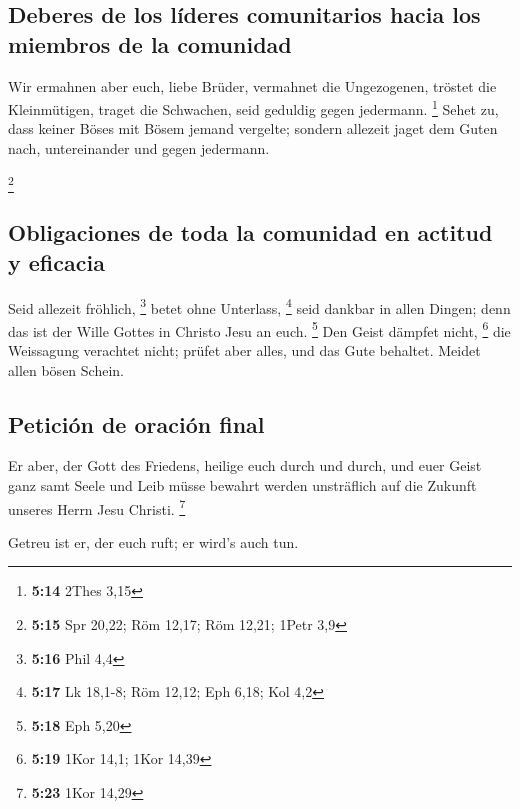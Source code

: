 \hypertarget{deberes-de-los-luxedderes-comunitarios-hacia-los-miembros-de-la-comunidad}{%
\subsection{Deberes de los líderes comunitarios hacia los miembros de la
comunidad}\label{deberes-de-los-luxedderes-comunitarios-hacia-los-miembros-de-la-comunidad}}

 Wir ermahnen aber euch, liebe Brüder, vermahnet die
Ungezogenen, tröstet die Kleinmütigen, traget die Schwachen, seid
geduldig gegen jedermann. \footnote{\textbf{5:14} 2Thes 3,15}
 Sehet zu, dass keiner Böses mit Bösem jemand vergelte;
sondern allezeit jaget dem Guten nach, untereinander und gegen
jedermann.

\footnote{\textbf{5:15} Spr 20,22; Röm 12,17; Röm 12,21; 1Petr 3,9}

\hypertarget{obligaciones-de-toda-la-comunidad-en-actitud-y-eficacia}{%
\subsection{Obligaciones de toda la comunidad en actitud y
eficacia}\label{obligaciones-de-toda-la-comunidad-en-actitud-y-eficacia}}

 Seid allezeit fröhlich, \footnote{\textbf{5:16} Phil 4,4}
 betet ohne Unterlass, \footnote{\textbf{5:17} Lk 18,1-8;
  Röm 12,12; Eph 6,18; Kol 4,2}  seid dankbar in allen
Dingen; denn das ist der Wille Gottes in Christo Jesu an euch.
\footnote{\textbf{5:18} Eph 5,20}  Den Geist dämpfet
nicht, \footnote{\textbf{5:19} 1Kor 14,1; 1Kor 14,39} 
die Weissagung verachtet nicht;  prüfet aber alles, und
das Gute behaltet.  Meidet allen bösen Schein.

\hypertarget{peticiuxf3n-de-oraciuxf3n-final}{%
\subsection{Petición de oración
final}\label{peticiuxf3n-de-oraciuxf3n-final}}

 Er aber, der Gott des Friedens, heilige euch durch und
durch, und euer Geist ganz samt Seele und Leib müsse bewahrt werden
unsträflich auf die Zukunft unseres Herrn Jesu Christi. \footnote{\textbf{5:23}
  1Kor 14,29}

 Getreu ist er, der euch ruft; er wird's auch tun.

